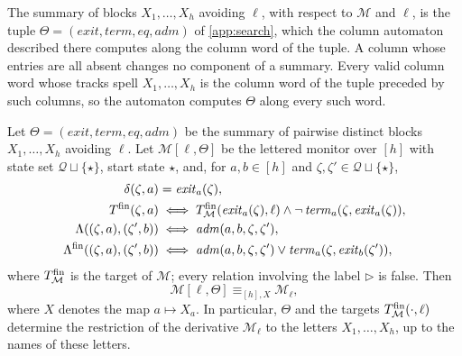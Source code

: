 The summary of blocks $X_1,\ldots,X_h$ avoiding $\ell$, with respect to
$\mathcal M$ and $\ell$, is the tuple
$\Theta=(\mathit{exit},\mathit{term},\mathit{eq},\mathit{adm})$ of
\cref{app:search}, which the column automaton described there computes along
the column word of the tuple. A column whose entries are all absent changes no
component of a summary. Every valid column word whose tracks spell
$X_1,\ldots,X_h$ is the column word of the tuple preceded by such columns, so
the automaton computes $\Theta$ along every such word.

\begin{lemma}\label{lem:summary-monitor}
Let $\Theta=(\mathit{exit},\mathit{term},\mathit{eq},\mathit{adm})$ be the
summary of pairwise distinct blocks $X_1,\ldots,X_h$ avoiding $\ell$. Let
$\mathcal M[\ell,\Theta]$ be the lettered monitor over $[h]$ with state set
$\mathcal Q\sqcup\{\star\}$, start state $\star$, and, for $a,b\in[h]$ and
$\zeta,\zeta'\in\mathcal Q\sqcup\{\star\}$,
\begin{equation}\label{eq:summary-monitor}
\begin{aligned}
 \delta(\zeta,a)&=\mathit{exit}_a(\zeta),\\
 T^{\mathrm{fin}}(\zeta,a)&\iff T^{\mathrm{fin}}_{\mathcal M}(\mathit{exit}_a(\zeta),\ell)\land
   \neg\,\mathit{term}_a(\zeta,\mathit{exit}_a(\zeta)),\\
 \Lambda((\zeta,a),(\zeta',b))&\iff\mathit{adm}(a,b,\zeta,\zeta'),\\
 \Lambda^{\mathrm{fin}}((\zeta,a),(\zeta',b))&\iff\mathit{adm}(a,b,\zeta,\zeta')\lor
   \mathit{term}_a(\zeta,\mathit{exit}_b(\zeta')),
\end{aligned}
\end{equation}
where $T^{\mathrm{fin}}_{\mathcal M}$ is the target of $\mathcal M$; every relation
involving the label $\triangleright$ is false. Then
\[
 \mathcal M[\ell,\Theta]\equiv_{[h],X}\mathcal M_\ell,
\]
where $X$ denotes the map $a\mapsto X_a$.
In particular, $\Theta$ and the targets $T^{\mathrm{fin}}_{\mathcal M}(\cdot,\ell)$
determine the restriction of the derivative $\mathcal M_\ell$ to the letters
$X_1,\ldots,X_h$, up to the names of these letters.
\end{lemma}

